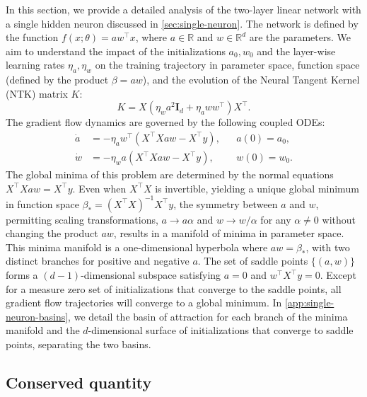 \documentclass{article}
\theoremstyle{plain}
\theoremstyle{definition}
\theoremstyle{remark}
\begin{document}
In this section, we provide a detailed analysis of the two-layer linear network with a single hidden neuron discussed in \cref{sec:single-neuron}. 
%
The network is defined by the function $f(x;\theta) = a w^\intercal x$, where $a \in \mathbb{R}$ and $w \in \mathbb{R}^d$ are the parameters.
%
We aim to understand the impact of the initializations $a_0, w_0$ and the layer-wise learning rates $\eta_a, \eta_w$ on the training trajectory in parameter space, function space (defined by the product $\beta = aw$), and the evolution of the Neural Tangent Kernel (NTK) matrix $K$:
%
\begin{equation}
    K = X \left(\eta_w a^2 \mathbf{I}_d + \eta_a ww^\intercal\right)X^\intercal.
\end{equation}
%
The gradient flow dynamics are governed by the following coupled ODEs:
%
\begin{align}
    \label{eq:single-neuron-dynamics-unwhitened-a}
    \dot{a} &= -\eta_a w^\intercal \left(X^\intercal X aw - X^\intercal y\right),  &&a(0) = a_0,\\
    \label{eq:single-neuron-dynamics-unwhitened-w}
    \dot{w} &= -\eta_w a \left(X^\intercal X aw - X^\intercal y\right),  &&w(0) = w_0.
\end{align}
%
The global minima of this problem are determined by the normal equations $X^\intercal X aw = X^\intercal y$.
%
Even when $X^\intercal X$ is invertible, yielding a unique global minimum in function space $\beta_* = (X^\intercal X)^{-1} X^\intercal y$, the symmetry between $a$ and $w$, permitting scaling transformations, $a \to a \alpha$ and $w \to w / \alpha$ for any $\alpha \neq 0$ without changing the product $aw$, results in a manifold of minima in parameter space.
%
This minima manifold is a one-dimensional hyperbola where $a w = \beta_*$, with two distinct branches for positive and negative $a$.
%
The set of saddle points $\{(a,w)\}$ forms a $(d-1)$-dimensional subspace satisfying $a = 0$ and $w^\intercal X^\intercal y = 0$.
%
Except for a measure zero set of initializations that converge to the saddle points, all gradient flow trajectories will converge to a global minimum. 
%
In \cref{app:single-neuron-basins}, we detail the basin of attraction for each branch of the minima manifold and the $d$-dimensional surface of initializations that converge to saddle points, separating the two basins.

\subsection{Conserved quantity}
\label{app:single-neuron-conserved}
\end{document}
